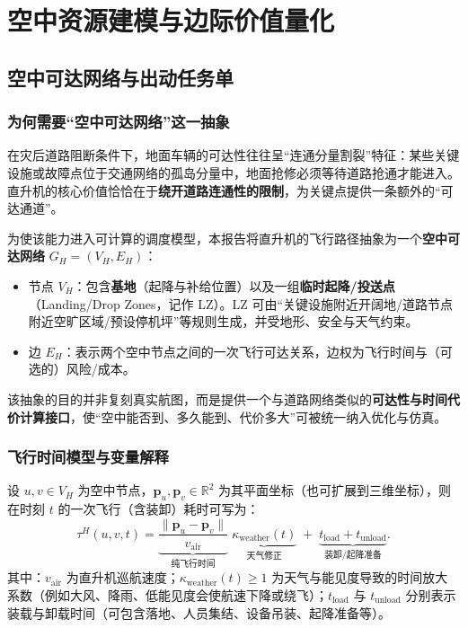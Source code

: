\documentclass[UTF8,zihao=-4,a4paper,fontset=fandol]{ctexrep}
\begin{document}
\chapter{空中资源建模与边际价值量化}\label{ch:heli}
\section{空中可达网络与出动任务单}
\subsection{为何需要“空中可达网络”这一抽象}
在灾后道路阻断条件下，地面车辆的可达性往往呈“连通分量割裂”特征：某些关键设施或故障点位于交通网络的孤岛分量中，地面抢修必须等待道路抢通才能进入。直升机的核心价值恰恰在于\textbf{绕开道路连通性的限制}，为关键点提供一条额外的“可达通道”。

为使该能力进入可计算的调度模型，本报告将直升机的飞行路径抽象为一个\textbf{空中可达网络} $G_H=(V_H,E_H)$：
\begin{itemize}[leftmargin=2em]
  \item 节点 $V_H$：包含\textbf{基地}（起降与补给位置）以及一组\textbf{临时起降/投送点}（Landing/Drop Zones，记作 LZ）。LZ 可由“关键设施附近开阔地/道路节点附近空旷区域/预设停机坪”等规则生成，并受地形、安全与天气约束。
  \item 边 $E_H$：表示两个空中节点之间的一次飞行可达关系，边权为飞行时间与（可选的）风险/成本。
\end{itemize}

该抽象的目的并非复刻真实航图，而是提供一个与道路网络类似的\textbf{可达性与时间代价计算接口}，使“空中能否到、多久能到、代价多大”可被统一纳入优化与仿真。

\subsection{飞行时间模型与变量解释}
设 $u,v\in V_H$ 为空中节点，$\mathbf{p}_u,\mathbf{p}_v\in\mathbb{R}^2$ 为其平面坐标（也可扩展到三维坐标），则在时刻 $t$ 的一次飞行（含装卸）耗时可写为：
\begin{equation}
  \tau^{H}(u,v,t) = \underbrace{\frac{\|\mathbf{p}_u-\mathbf{p}_v\|}{v_{\text{air}}}}_{\text{纯飞行时间}}\;\underbrace{\kappa_{\text{weather}}(t)}_{\text{天气修正}}\; +\; \underbrace{t_{\text{load}} + t_{\text{unload}}}_{\text{装卸/起降准备}}.
\end{equation}
其中：$v_{\text{air}}$ 为直升机巡航速度；$\kappa_{\text{weather}}(t)\ge 1$ 为天气与能见度导致的时间放大系数（例如大风、降雨、低能见度会使航速下降或绕飞）；$t_{\text{load}}$ 与 $t_{\text{unload}}$ 分别表示装载与卸载时间（可包含落地、人员集结、设备吊装、起降准备等）。
\end{document}
